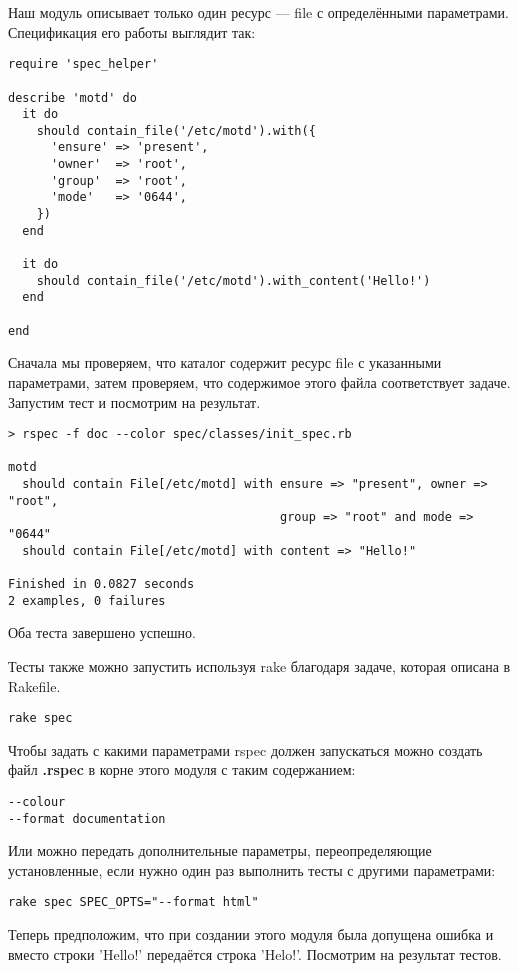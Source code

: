 Наш модуль описывает только один ресурс --- file с определёнными параметрами. Спецификация его работы выглядит так:

\begin{verbatim}
require 'spec_helper'

describe 'motd' do
  it do
    should contain_file('/etc/motd').with({
      'ensure' => 'present',
      'owner'  => 'root',
      'group'  => 'root',
      'mode'   => '0644',
    })
  end

  it do
    should contain_file('/etc/motd').with_content('Hello!')
  end

end
\end{verbatim}

Сначала мы проверяем, что каталог содержит ресурс file с указанными параметрами, затем проверяем, что содержимое этого файла соответствует задаче. Запустим тест и посмотрим на результат.

\begin{verbatim}
> rspec -f doc --color spec/classes/init_spec.rb 

motd
  should contain File[/etc/motd] with ensure => "present", owner => "root",
                                      group => "root" and mode => "0644"
  should contain File[/etc/motd] with content => "Hello!"

Finished in 0.0827 seconds
2 examples, 0 failures
\end{verbatim}

Оба теста завершено успешно.

Тесты также можно запустить используя rake благодаря задаче, которая описана в Rakefile.

\begin{verbatim}
rake spec
\end{verbatim}

Чтобы задать с какими параметрами rspec должен запускаться можно создать файл \textbf{.rspec} в корне этого модуля с таким содержанием:

\begin{verbatim}
--colour
--format documentation
\end{verbatim}

Или можно передать дополнительные параметры, переопределяющие установленные, если нужно один раз выполнить тесты с другими параметрами:

\begin{verbatim}
rake spec SPEC_OPTS="--format html"
\end{verbatim}

Теперь предположим, что при создании этого модуля была допущена ошибка и вместо строки 'Hello!' передаётся строка 'Helo!'. Посмотрим на результат тестов.

